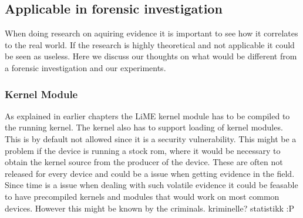 \subsection{Applicable in forensic investigation}
When doing research on aquiring evidence it is important to see how it correlates 
to the real world. If the research is highly theoretical and not applicable it 
could be seen as useless. Here we discuss our thoughts on what would be different 
from a forensic investigation and our experiments.

\subsubsection{Kernel Module}
As explained in earlier chapters the LiME kernel module has to be compiled to the 
running kernel. The kernel also has to support loading of kernel modules. This is 
by default not allowed since it is a security vulnerability. This might be a 
problem if the device is running a stock rom, where it would be necessary to obtain 
the kernel source from the producer of the device. These are often not released for 
every device and could be a issue when getting evidence in the field. Since time is 
a issue when dealing with such volatile evidence it could be feasable to have 
precompiled kernels and modules that would work on most common devices. However 
this might be known by the criminals. %
kriminelle? statistikk :P
